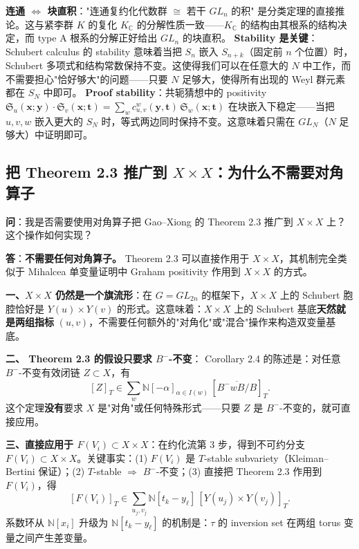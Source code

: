 \begin{insight}
\textbf{连通 $\Leftrightarrow$ 块直积}："连通复约化代数群 $\cong$ 若干 $GL_n$ 的积" 是分类定理的直接推论。这与紧李群 $K$ 的复化 $K_\mathbb{C}$ 的分解性质一致——$K_\mathbb{C}$ 的结构由其根系的结构决定，而 type A 根系的分解正好给出 $GL_n$ 的块直积。
\textbf{Stability 是关键}：Schubert calculus 的 stability 意味着当把 $S_n$ 嵌入 $S_{n+k}$（固定前 $n$ 个位置）时，Schubert 多项式和结构常数保持不变。这使得我们可以在任意大的 $N$ 中工作，而不需要担心"恰好够大"的问题——只要 $N$ 足够大，使得所有出现的 Weyl 群元素都在 $S_N$ 中即可。
\textbf{Proof stability}：共轭猜想中的 positivity $\mathfrak{S}_u(\mathbf{x};\mathbf{y})\cdot\mathfrak{S}_v(\mathbf{x};\mathbf{t}) = \sum_w c_{u,v}^w(\mathbf{y},\mathbf{t})\,\mathfrak{S}_w(\mathbf{x};\mathbf{t})$ 在块嵌入下稳定——当把 $u,v,w$ 嵌入更大的 $S_N$ 时，等式两边同时保持不变。这意味着只需在 $GL_N$（$N$ 足够大）中证明即可。
\end{insight}

\subsection{把 \cite{GX2025} Theorem 2.3 推广到 $X \times X$：为什么不需要对角算子}\label{sec:qa-GX-on-XX}
\textbf{问}：我是否需要使用对角算子把 Gao--Xiong \cite{GX2025} 的 Theorem 2.3 推广到 $X \times X$ 上？这个操作如何实现？

\textbf{答}：\textbf{不需要任何对角算子。} \cite{GX2025} Theorem 2.3 可以直接作用于 $X \times X$，其机制完全类似于 Mihalcea 单变量证明中 Graham positivity 作用到 $X \times X$ 的方式。

\textbf{一、$X \times X$ 仍然是一个旗流形}：在 $G = GL_{2n}$ 的框架下，$X \times X$ 上的 Schubert 胞腔恰好是 $Y(u) \times Y(v)$ 的形式。这意味着：$X \times X$ 上的 Schubert 基底\textbf{天然就是两组指标} $(u,v)$，不需要任何额外的"对角化"或"混合"操作来构造双变量基底。

\textbf{二、\cite{GX2025} Theorem 2.3 的假设只要求 $B^-$-不变}：\cite{GX2025} Corollary 2.4 的陈述是：对任意 $B^-$-不变有效闭链 $Z \subset X$，有
$$[Z]_T \in \sum_w \mathbb{N}[-\alpha]_{\alpha \in I(w)}\,[\overline{B^-wB/B}]_T.$$
这个定理\textbf{没有}要求 $X$ 是"对角"或任何特殊形式——只要 $Z$ 是 $B^-$-不变的，就可直接应用。

\textbf{三、直接应用于 $F(V_i) \subset X \times X$}：在约化流第 3 步，得到不可约分支 $F(V_i) \subset X \times X$。关键事实：(1) $F(V_i)$ 是 $T$-stable subvariety（Kleiman--Bertini 保证）；(2) $T$-stable $\Longrightarrow$ $B^-$-不变；(3) 直接把 \cite{GX2025} Theorem 2.3 作用到 $F(V_i)$，得
$$[F(V_i)]_T \in \sum_{u_j,v_j} \mathbb{N}[t_k - y_\ell]\,[Y(u_j)\times Y(v_j)]_T.$$
系数环从 $\mathbb{N}[x_i]$ 升级为 $\mathbb{N}[t_k - y_\ell]$ 的机制是：$\tau$ 的 inversion set 在两组 torus 变量之间产生差变量。

